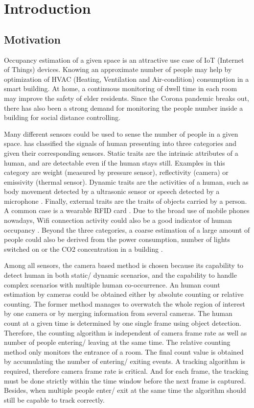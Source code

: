 \chapter{Introduction} \label{ch:intro}
\section{Motivation}
Occupancy estimation of a given space is an attractive use case of IoT (Internet of Things) devices. Knowing an approximate number of people may help by optimization of HVAC (Heating, Ventilation and Air-condition) consumption in a smart building. At home, a continuous monitoring of dwell time in each room may improve the safety of elder residents. Since the Corona pandemic breaks out, there has also been a strong demand for monitoring the people number inside a building for social distance controlling.

Many different sensors could be used to sense the number of people in a given space. \citeauthor{humansense2010survey} \cite{humansense2010survey} has classified the signals of human presenting into three categories and given their corresponding sensors. Static traits are the intrinsic attributes of a human, and are detectable even if the human stays still. Examples in this category are weight (measured by pressure sensor), reflectivity (camera) or emissivity (thermal sensor). Dynamic traits are the activities of a human, such as body movement detected by a ultrasonic sensor \cite{ultrasonic2012doorjamb} or speech detected by a microphone \cite{microphone}. Finally, external traits are the traits of objects carried by a person. A common case is a wearable RFID card \cite{RFID}. Due to the broad use of mobile phones nowadays, Wifi connection activity could also be a good indicator of human occupancy \cite{Wifi}. Beyond the three categories, a coarse estimation of a large amount of people could also be derived from the power consumption, number of lights switched on or the CO2 concentration in a building \cite{CO2}.

Among all sensors, the camera based method is chosen because its capability to detect human in both static/ dynamic scenarios, and the capability to handle complex scenarios with multiple human co-occurrence. An human count estimation by cameras could be obtained either by absolute counting or relative counting. The former method manages to overwatch the whole region of interest by one camera or by merging information from several cameras. The human count at a given time is determined by one single frame using object detection. Therefore, the counting algorithm is independent of camera frame rate as well as number of people entering/ leaving at the same time. The relative counting method only monitors the entrance of a room. The final count value is obtained by accumulating the number of entering/ exiting events. A tracking algorithm is required, therefore camera frame rate is critical. And for each frame, the tracking must be done strictly within the time window before the next frame is captured. Besides, when multiple people enter/ exit at the same time the algorithm should still be capable to track correctly.

